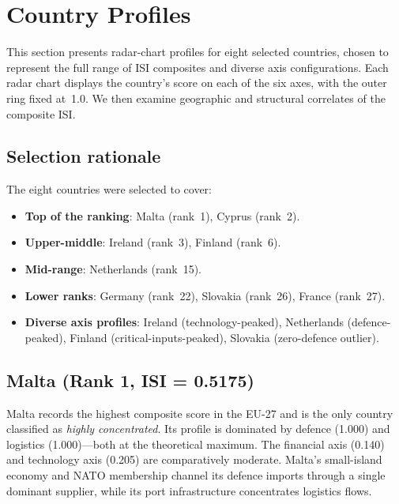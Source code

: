 \section{Country Profiles}\label{sec:country-profiles}

This section presents radar-chart profiles for eight selected
countries, chosen to represent the full range of ISI composites
and diverse axis configurations.  Each radar chart displays the
country's score on each of the six axes, with the outer ring fixed
at~1.0.  We then examine geographic and structural correlates of the
composite ISI.

\subsection{Selection rationale}

The eight countries were selected to cover:
\begin{itemize}[leftmargin=2em]
  \item \textbf{Top of the ranking}: Malta (rank~1), Cyprus (rank~2).
  \item \textbf{Upper-middle}: Ireland (rank~3), Finland (rank~6).
  \item \textbf{Mid-range}: Netherlands (rank~15).
  \item \textbf{Lower ranks}: Germany (rank~22), Slovakia (rank~26),
    France (rank~27).
  \item \textbf{Diverse axis profiles}: Ireland (technology-peaked),
    Netherlands (defence-peaked), Finland (critical-inputs-peaked),
    Slovakia (zero-defence outlier).
\end{itemize}

\subsection{Malta (Rank 1, ISI = 0.5175)}

Malta records the highest composite score in the EU-27 and is the
only country classified as \emph{highly concentrated}.  Its profile
is dominated by defence (1.000) and logistics (1.000)---both at the
theoretical maximum.  The financial axis (0.140) and technology axis
(0.205) are comparatively moderate.  Malta's small-island economy
and NATO membership channel its defence imports through a single
dominant supplier, while its port infrastructure concentrates
logistics flows.

